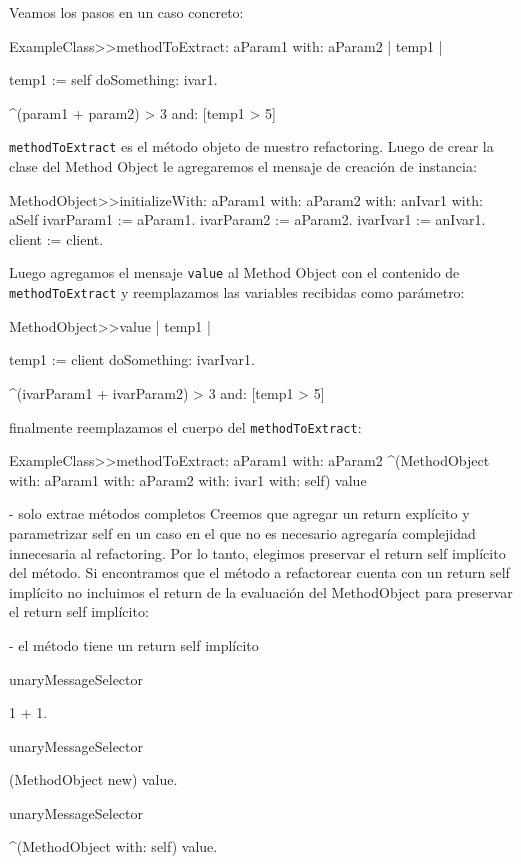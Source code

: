 Veamos los pasos en un caso concreto:

\begin{code}
ExampleClass>>methodToExtract: aParam1 with: aParam2
    | temp1 |

    temp1 := self doSomething: ivar1.

    ^(param1 + param2) > 3 and: [temp1 > 5]
\end{code}

\lstinline{methodToExtract} es el método objeto de nuestro refactoring. Luego de crear la clase del
Method Object le agregaremos el mensaje de creación de instancia:

\begin{code}
MethodObject>>initializeWith: aParam1 with: aParam2 with: anIvar1 with: aSelf
    ivarParam1 := aParam1.
    ivarParam2 := aParam2.
    ivarIvar1 := anIvar1.
    client := client.
\end{code}

Luego agregamos el mensaje \lstinline{value} al Method Object con el contenido de
\lstinline{methodToExtract} y reemplazamos las variables recibidas como parámetro:

\begin{code}
MethodObject>>value
    | temp1 |

    temp1 := client doSomething: ivarIvar1.

    ^(ivarParam1 + ivarParam2) > 3 and: [temp1 > 5]
\end{code}

finalmente reemplazamos el cuerpo del \lstinline{methodToExtract}:

\begin{code}
ExampleClass>>methodToExtract: aParam1 with: aParam2
    ^(MethodObject with: aParam1 with: aParam2 with: ivar1 with: self) value
\end{code}

- solo extrae métodos completos
Creemos que agregar un return explícito y parametrizar self en un caso en el que no es necesario
agregaría complejidad innecesaria al refactoring. Por lo tanto, elegimos preservar el return self
implícito del método. Si encontramos que el método a refactorear cuenta con un return self implícito
no incluimos el return de la evaluación del MethodObject para preservar el return self implícito:

- el método tiene un return self implícito

\begin{code}

unaryMessageSelector

 1 + 1.

unaryMessageSelector
 
 (MethodObject new) value.

unaryMessageSelector

 ^(MethodObject with: self) value.

\end{code}

